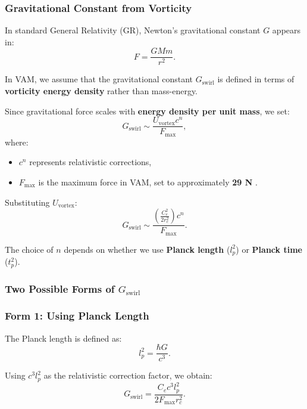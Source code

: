 \subsubsection*{Gravitational Constant from Vorticity}
In standard General Relativity (GR), Newton’s gravitational constant \( G \) appears in:
\begin{equation*}
    F = \frac{GMm}{r^2}.
\end{equation*}

In VAM, we assume that the gravitational constant \(  G_\text{swirl} \) is defined in terms of \textbf{vorticity energy density} rather than mass-energy.

Since gravitational force scales with \textbf{energy density per unit mass}, we set:
\begin{equation*}
     G_\text{swirl} \sim \frac{U_\text{vortex} c^n}{F_{\max}},
\end{equation*}
where:
\begin{itemize}
    \item \( c^n \) represents relativistic corrections,
    \item \( F_{\max} \) is the maximum force in VAM, set to approximately \textbf{29 N} \cite{schiller_max_force}.
\end{itemize}

Substituting \( U_\text{vortex} \):
\begin{equation*}
     G_\text{swirl} \sim \frac{\left( \frac{C_e^2}{2 r_c^2} \right) c^n}{F_{\max}}.
\end{equation*}

The choice of \( n \) depends on whether we use \textbf{Planck length} (\( l_p^2 \)) or \textbf{Planck time} (\( t_p^2 \)).

\subsubsection*{Two Possible Forms of \(  G_\text{swirl} \)}
\subsubsection*{Form 1: Using Planck Length}
The Planck length is defined as:
\begin{equation*}
    l_p^2 = \frac{\hbar G}{c^3}.
\end{equation*}

Using \( c^3 l_p^2 \) as the relativistic correction factor, we obtain:
\begin{equation*}
     G_\text{swirl} = \frac{C_e c^3 l_p^2}{2 F_{\max} r_c^2}.
\end{equation*}

